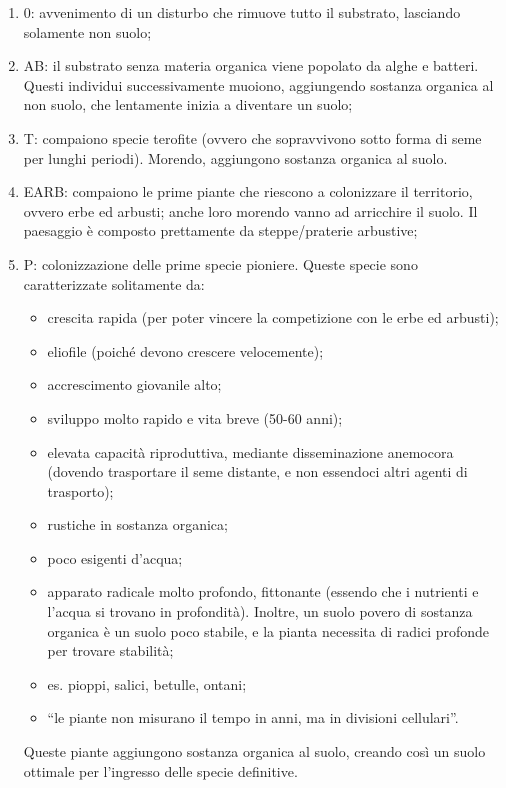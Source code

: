 \begin{enumerate}[nosep]
    \item 0: avvenimento di un disturbo che rimuove tutto il substrato, lasciando solamente non suolo;
    \item AB: il substrato senza materia organica viene popolato da alghe e batteri. Questi individui successivamente muoiono, aggiungendo sostanza organica al non suolo, che lentamente inizia a diventare un suolo;
    \item T: compaiono specie terofite (ovvero che sopravvivono sotto forma di seme per lunghi periodi). Morendo, aggiungono sostanza organica al suolo.
    \item EARB: compaiono le prime piante che riescono a colonizzare il territorio, ovvero erbe ed arbusti; anche loro morendo vanno ad arricchire il suolo. Il paesaggio è composto prettamente da steppe/praterie arbustive;
    \item P: colonizzazione delle prime specie pioniere. Queste specie sono caratterizzate solitamente da:
    \begin{itemize}[nosep]
        \item crescita rapida (per poter vincere la competizione con le erbe ed arbusti);
        \item eliofile (poiché devono crescere velocemente);
        \item accrescimento giovanile alto;
        \item sviluppo molto rapido e vita breve (50-60 anni);
        \item elevata capacità riproduttiva, mediante disseminazione anemocora (dovendo trasportare il seme distante, e non essendoci altri agenti di trasporto);
        \item rustiche in sostanza organica;
        \item poco esigenti d'acqua;
        \item apparato radicale molto profondo, fittonante (essendo che i nutrienti e l'acqua si trovano in profondità). Inoltre, un suolo povero di sostanza organica è un suolo poco stabile, e la pianta necessita di radici profonde per trovare stabilità;
        \item es. pioppi, salici, betulle, ontani;
        \item ``le piante non misurano il tempo in anni, ma in divisioni cellulari''.
    \end{itemize}
Queste piante aggiungono sostanza organica al suolo, creando così un suolo ottimale per l'ingresso delle specie definitive.

\end{enumerate}
